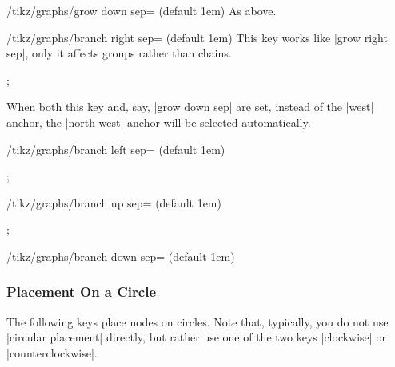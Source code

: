 \begin{key}{/tikz/graphs/grow down sep= (default 1em)}
    As above.
\end{key}

\begin{key}{/tikz/graphs/branch right sep= (default 1em)}
    This key works like |grow right sep|, only it affects groups rather than
    chains.
\begin{codeexample}[]
\tikz {};
\end{codeexample}
    When both this key and, say, |grow down sep| are set, instead of the |west|
    anchor, the |north west| anchor will be selected automatically.
\end{key}

\begin{key}{/tikz/graphs/branch left sep= (default 1em)}
%
\begin{codeexample}[]
\tikz {};
\end{codeexample}
%
\end{key}

\begin{key}{/tikz/graphs/branch up sep= (default 1em)}
%
\begin{codeexample}[]
\tikz {};
\end{codeexample}
%
\end{key}

\begin{key}{/tikz/graphs/branch down sep= (default 1em)}
\end{key}


\subsubsection{Placement On a Circle}

The following keys place nodes on circles. Note that, typically, you do not use
|circular placement| directly, but rather use one of the two keys |clockwise|
or |counterclockwise|.

